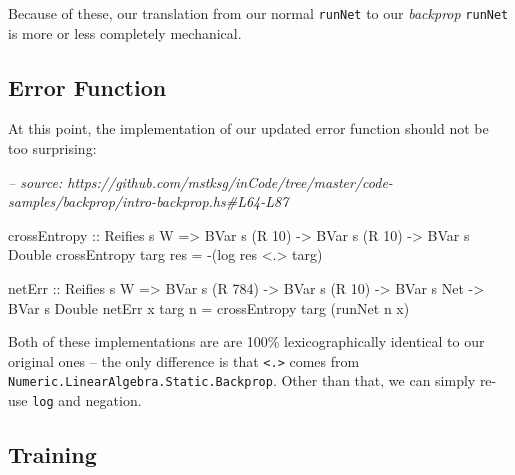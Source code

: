 \documentclass[]{article}
\newenvironment{Shaded}{}{}
\newcommand{\CommentTok}[1]{\textcolor[rgb]{0.38,0.63,0.69}{\textit{#1}}}
\newcommand{\DataTypeTok}[1]{\textcolor[rgb]{0.56,0.13,0.00}{#1}}
\newcommand{\DecValTok}[1]{\textcolor[rgb]{0.25,0.63,0.44}{#1}}
\newcommand{\FunctionTok}[1]{\textcolor[rgb]{0.02,0.16,0.49}{#1}}
\newcommand{\NormalTok}[1]{#1}
\newcommand{\OtherTok}[1]{\textcolor[rgb]{0.00,0.44,0.13}{#1}}
\begin{document}
Because of these, our translation from our normal \texttt{runNet} to our
\emph{backprop} \texttt{runNet} is more or less completely mechanical.

\hypertarget{error-function-1}{%
\subsection{Error Function}\label{error-function-1}}

At this point, the implementation of our updated error function should not be
too surprising:

\begin{Shaded}
\begin{Highlighting}[]
\CommentTok{-- source: https://github.com/mstksg/inCode/tree/master/code-samples/backprop/intro-backprop.hs#L64-L87}

\NormalTok{crossEntropy}
\OtherTok{    ::} \DataTypeTok{Reifies}\NormalTok{ s }\DataTypeTok{W}
    \OtherTok{=>} \DataTypeTok{BVar}\NormalTok{ s (}\DataTypeTok{R} \DecValTok{10}\NormalTok{)}
    \OtherTok{->} \DataTypeTok{BVar}\NormalTok{ s (}\DataTypeTok{R} \DecValTok{10}\NormalTok{)}
    \OtherTok{->} \DataTypeTok{BVar}\NormalTok{ s }\DataTypeTok{Double}
\NormalTok{crossEntropy targ res }\FunctionTok{=} \FunctionTok{-}\NormalTok{(log res }\FunctionTok{<.>}\NormalTok{ targ)}

\NormalTok{netErr}
\OtherTok{    ::} \DataTypeTok{Reifies}\NormalTok{ s }\DataTypeTok{W}
    \OtherTok{=>} \DataTypeTok{BVar}\NormalTok{ s (}\DataTypeTok{R} \DecValTok{784}\NormalTok{)}
    \OtherTok{->} \DataTypeTok{BVar}\NormalTok{ s (}\DataTypeTok{R} \DecValTok{10}\NormalTok{)}
    \OtherTok{->} \DataTypeTok{BVar}\NormalTok{ s }\DataTypeTok{Net}
    \OtherTok{->} \DataTypeTok{BVar}\NormalTok{ s }\DataTypeTok{Double}
\NormalTok{netErr x targ n }\FunctionTok{=}\NormalTok{ crossEntropy targ (runNet n x)}
\end{Highlighting}
\end{Shaded}

Both of these implementations are are 100\% lexicographically identical to our
original ones -- the only difference is that \texttt{\textless{}.\textgreater{}}
comes from \texttt{Numeric.LinearAlgebra.Static.Backprop}. Other than that, we
can simply re-use \texttt{log} and negation.

\hypertarget{training-1}{%
\subsection{Training}\label{training-1}}
\end{document}
